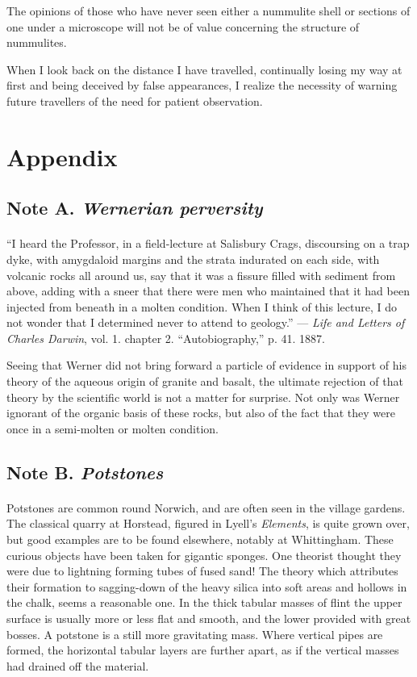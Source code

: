 \documentclass[a4paper, 12pt, oneside]{article}
\begin{document}
The opinions of those who have never seen either a nummulite shell or sections of one under a microscope will not be of value concerning the structure of nummulites.

When I look back on the distance I have travelled, continually losing my way at first and being deceived by false appearances, I realize the necessity of warning future travellers of the need for patient observation.
\clearpage
\section{Appendix}
\subsection{Note A. \emph{Wernerian perversity}}
\paragraph{}
``I heard the Professor, in a field-lecture at Salisbury Crags, discoursing on a trap dyke, with amygdaloid margins and the strata indurated on each side, with volcanic rocks all around us, say that it was a fissure filled with sediment from above, adding with a sneer that there were men who maintained that it had been injected from beneath in a molten condition. When I think of this lecture, I do not wonder that I determined never to attend to geology.'' --- \emph{Life and Letters of Charles Darwin}, vol. 1. chapter 2. ``Autobiography,'' p. 41. 1887.

Seeing that Werner did not bring forward a particle of evidence in support of his theory of the aqueous origin of granite and basalt, the ultimate rejection of that theory by the scientific world is not a matter for surprise. Not only was Werner ignorant of the organic basis of these rocks, but also of the fact that they were once in a semi-molten or molten condition.

\subsection{Note B. \emph{Potstones}}
\paragraph{}
Potstones are common round Norwich, and are often seen in the village gardens. The classical quarry at Horstead, figured in Lyell's \emph{Elements}, is quite grown over, but good examples are to be found elsewhere, notably at Whittingham. These curious objects have been taken for gigantic sponges. One theorist thought they were due to lightning forming tubes of fused sand! The theory which attributes their formation to sagging-down of the heavy silica into soft areas and hollows in the chalk, seems a reasonable one. In the thick tabular masses of flint the upper surface is usually more or less flat and smooth, and the lower provided with great bosses. A potstone is a still more gravitating mass. Where vertical pipes are formed, the horizontal tabular layers are further apart, as if the vertical masses had drained off the material.
\end{document}
